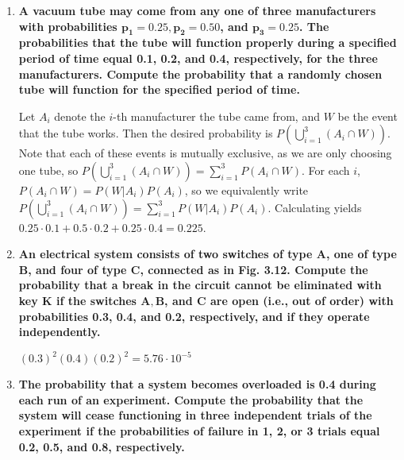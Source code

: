 \documentclass[10pt, oneside]{article}   	%
\theoremstyle{definition}
\begin{document}
\begin{enumerate}[label=3.\arabic*]
\item  \begin{tcolorbox}[
  colback=Cerulean!5!white,
  colframe=Cerulean!75!black]
\textbf{A vacuum tube may come from any one of three manufacturers with probabilities $\bm{p_1 = 0.25, p_2 = 0.50}$, and $\bm{p_3 = 0.25}$. The probabilities that the tube will function properly during a specified period of time equal 0.1, 0.2, and 0.4, respectively, for the three manufacturers. Compute the probability that a randomly chosen tube will function for the specified period of time.}
\end{tcolorbox}

Let $A_i$ denote the $i$-th manufacturer the tube came from, and $W$ be the event that the tube works. Then the desired probability is $P(\bigcup^3_{i=1} (A_i \cap W))$. Note that each of these events is mutually exclusive, as we are only choosing one tube, so $P(\bigcup^3_{i=1} (A_i \cap W)) = \sum^3_{i = 1} P(A_i \cap W)$. For each $i$, $P(A_i \cap W) = P(W | A_i) P(A_i)$, so we equivalently write  $P(\bigcup^3_{i=1} (A_i \cap W)) = \sum^3_{i = 1} P(W | A_i) P(A_i)$. Calculating yields $0.25 \cdot 0.1 + 0.5 \cdot 0.2 + 0.25 \cdot 0.4 = \boxed{0.225}$.

\item  \begin{tcolorbox}[
  colback=Cerulean!5!white,
  colframe=Cerulean!75!black]
\textbf{An electrical system consists of two switches of type $\bm{A}$, one of type $\bm{B}$, and four of type $\bm{C}$, connected as in Fig. 3.12. Compute the probability that a break in the circuit cannot be eliminated with key $\bm{K}$ if the switches $\bm{A, B}$, and $\bm{C}$ are open (i.e., out of order) with probabilities 0.3, 0.4, and 0.2, respectively, and if they operate independently.}
\end{tcolorbox}

$(0.3)^2 (0.4) (0.2)^2 = \boxed{5.76 \cdot 10^{-5}}$

\item  \begin{tcolorbox}[
  colback=Cerulean!5!white,
  colframe=Cerulean!75!black]
\textbf{The probability that a system becomes overloaded is 0.4 during each run of an experiment. Compute the probability that the system will cease functioning in three independent trials of the experiment if the probabilities of failure in 1, 2, or 3 trials equal 0.2, 0.5, and 0.8, respectively.}
\end{tcolorbox}


\end{enumerate}
\end{document}
